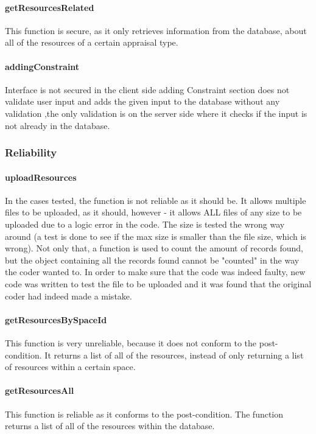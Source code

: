 \documentclass[a4paper]{article}
\begin{document}
\paragraph{getResourcesRelated}
This function is secure, as it only retrieves information from the database, about all of the resources of a certain appraisal type.

\paragraph{addingConstraint}
Interface is not secured in the client side adding Constraint section does not validate user input and adds the given input to the database without any validation ,the only validation is on the server side where it checks if the input is not already in the database.

\subsubsection {Reliability}

\paragraph{uploadResources}
In the cases tested, the function is not reliable as it should be. It allows multiple files to be uploaded, as it should, however - it allows ALL files of any size to be uploaded due to a logic error in the code. The size is tested the wrong way around (a test is done to see if the max size is smaller than the file size, which is wrong). Not only that, a function is used to count the amount of records found, but the object containing all the records found cannot be "counted" in the way the coder wanted to. In order to make sure that the code was indeed faulty, new code was written to test the file to be uploaded and it was found that the original coder had indeed made a mistake.

\paragraph{getResourcesBySpaceId}
This function is very unreliable, because it does not conform to the post-condition. It returns a list of all of the resources, instead of only returning a list of resources within a certain space.

\paragraph{getResourcesAll}
This function is reliable as it conforms to the post-condition. The function returns a list of all of the resources within the database.
\end{document}
